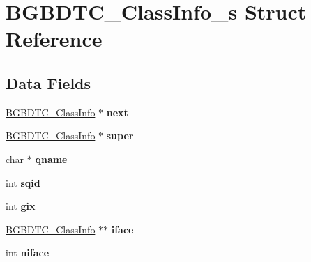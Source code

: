 \hypertarget{structBGBDTC__ClassInfo__s}{\section{B\-G\-B\-D\-T\-C\-\_\-\-Class\-Info\-\_\-s Struct Reference}
\label{structBGBDTC__ClassInfo__s}
}
\subsection*{Data Fields}
\begin{DoxyCompactItemize}
\item 
\hypertarget{structBGBDTC__ClassInfo__s_ae513b344cfe8f9d2763be101299369a1}{\hyperlink{structBGBDTC__ClassInfo__s}{B\-G\-B\-D\-T\-C\-\_\-\-Class\-Info} $\ast$ {\bfseries next}}\label{structBGBDTC__ClassInfo__s_ae513b344cfe8f9d2763be101299369a1}

\item 
\hypertarget{structBGBDTC__ClassInfo__s_a3bf8bb19b25467993327a67ecb572f3b}{\hyperlink{structBGBDTC__ClassInfo__s}{B\-G\-B\-D\-T\-C\-\_\-\-Class\-Info} $\ast$ {\bfseries super}}\label{structBGBDTC__ClassInfo__s_a3bf8bb19b25467993327a67ecb572f3b}

\item 
\hypertarget{structBGBDTC__ClassInfo__s_a47fa140aaca1d2a1b2b5b0ae6ad9efa4}{char $\ast$ {\bfseries qname}}\label{structBGBDTC__ClassInfo__s_a47fa140aaca1d2a1b2b5b0ae6ad9efa4}

\item 
\hypertarget{structBGBDTC__ClassInfo__s_a8a5ffe13c72687c5bb44dec64a209516}{int {\bfseries sqid}}\label{structBGBDTC__ClassInfo__s_a8a5ffe13c72687c5bb44dec64a209516}

\item 
\hypertarget{structBGBDTC__ClassInfo__s_afa2f243eb494d7b42b2ce510a89cfd11}{int {\bfseries gix}}\label{structBGBDTC__ClassInfo__s_afa2f243eb494d7b42b2ce510a89cfd11}

\item 
\hypertarget{structBGBDTC__ClassInfo__s_a5838e5d3e2bf899d4f1b821ec97a800e}{\hyperlink{structBGBDTC__ClassInfo__s}{B\-G\-B\-D\-T\-C\-\_\-\-Class\-Info} $\ast$$\ast$ {\bfseries iface}}\label{structBGBDTC__ClassInfo__s_a5838e5d3e2bf899d4f1b821ec97a800e}

\item 
\hypertarget{structBGBDTC__ClassInfo__s_a0296a185c3a84748a355e18858111205}{int {\bfseries niface}}\label{structBGBDTC__ClassInfo__s_a0296a185c3a84748a355e18858111205}


\end{DoxyCompactItemize}
